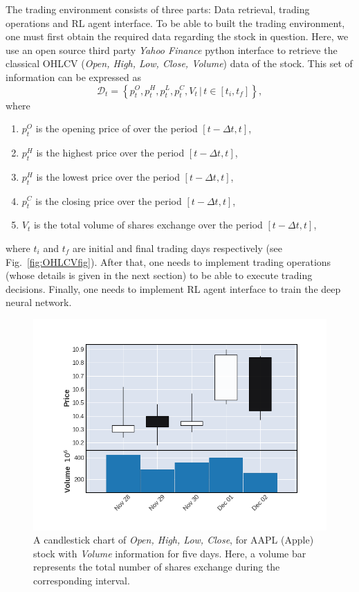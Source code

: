 \documentclass[twocolumn,aps,pra,superscriptaddress,nofootinbib,longbibliography]{revtex4-2}
\begin{document}
The trading environment consists of three parts: Data retrieval, trading operations and RL agent interface. To be able to built the trading environment, one must first obtain the required data regarding the stock in question. Here, we use an open source third party \textit{Yahoo Finance} python interface to retrieve the classical OHLCV (\textit{Open, High, Low, Close, Volume}) data of the stock. This set of information can be expressed as 
\begin{equation}
    \mathcal{D}_t = \left\{p_{t}^O, p_{t}^H, p_{t}^L, p_{t}^C, V_{t} \,| \, t \in [t_i, t_f]\right\},
\end{equation}
where 
\begin{enumerate}[-]
    \item \(p_t^O\) is the opening price of over the period \([t - \Delta t, t]\),
    \item \(p_t^H\) is the highest price over the period \([t - \Delta t, t]\),
    \item \(p_t^H\) is the lowest price over the period \([t - \Delta t, t]\),
    \item \(p_t^C\) is the closing price over the period \([t - \Delta t, t]\),
    \item \(V_t\) is the total volume of shares exchange over the period \([t - \Delta t, t]\),
\end{enumerate}
where \(t_i\) and \(t_f\) are initial and final trading days respectively (see Fig.~\ref{fig:OHLCVfig}). After that, one needs to implement trading operations (whose details is given in the next section) to be able to execute trading decisions. Finally, one needs to implement RL agent interface to train the deep neural network. 

\begin{figure}
    \centering
    \includegraphics[scale=0.4]{Figs/Figures/OHLCV.png}
    \caption{A candlestick chart of \textit{Open, High, Low, Close}, for AAPL (Apple) stock with \textit{Volume} information for five days. Here, a volume bar represents the total number of shares exchange during the corresponding interval.}
\end{figure}
\end{document}
